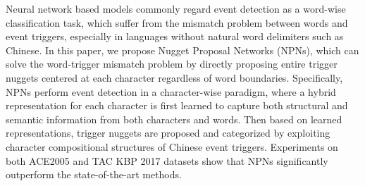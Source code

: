 Neural network based models commonly regard event detection as a word-wise classification task, which suffer from the mismatch problem between words and event triggers, especially in languages without natural word delimiters such as Chinese. In this paper, we propose Nugget Proposal Networks (NPNs), which can solve the word-trigger mismatch problem by directly proposing entire trigger nuggets centered at each character regardless of word boundaries. Specifically, NPNs perform event detection in a character-wise paradigm, where a hybrid representation for each character is first learned to capture both structural and semantic information from both characters and words. Then based on learned representations, trigger nuggets are proposed and categorized by exploiting character compositional structures of Chinese event triggers. Experiments on both ACE2005 and TAC KBP 2017 datasets show that NPNs significantly outperform the state-of-the-art methods.
